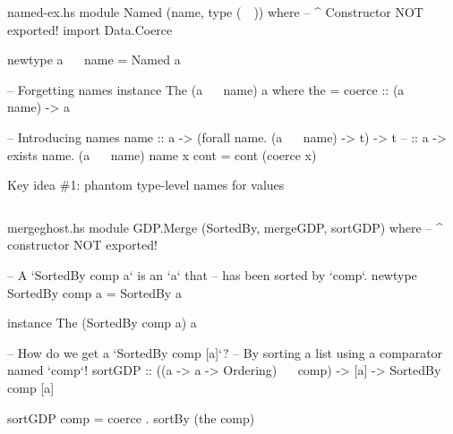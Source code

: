 \documentclass{beamer}
\begin{document}

\begin{filecontents*}{named-ex.hs}
module Named (name, type (~~)) where
                      -- ^ Constructor NOT exported!
import Data.Coerce

newtype a ~~ name = Named a

-- Forgetting names
instance The (a ~~ name) a where
    the = coerce :: (a ~~ name) -> a

-- Introducing names
name :: a -> (forall name. (a ~~ name) -> t) -> t
--   :: a ->  exists name. (a ~~ name)
name x cont = cont (coerce x)
\end{filecontents*}

\begin{frame}{Key idea \#1: phantom type-level names for values}
\inputminted{haskell}{named-ex.hs}
\end{frame}


\begin{filecontents*}{mergeghost.hs}
module GDP.Merge (SortedBy, mergeGDP, sortGDP) where
                  -- ^ constructor NOT exported!

-- A `SortedBy comp a` is an `a` that
-- has been sorted by `comp`.
newtype SortedBy comp a = SortedBy a

instance The (SortedBy comp a) a

-- How do we get a `SortedBy comp [a]`?
-- By sorting a list using a comparator named `comp`!
sortGDP :: ((a -> a -> Ordering) ~~ comp)
        -> [a]
        -> SortedBy comp [a]

sortGDP comp = coerce . sortBy (the comp)
\end{filecontents*}
\end{document}
